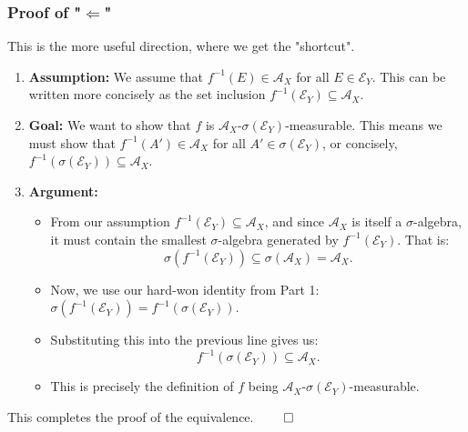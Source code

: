 \documentclass[11pt,a4paper]{article}
\theoremstyle{exercise_style}
\theoremstyle{definition}
\begin{document}
\subsubsection{Proof of "$\Leftarrow$"}
This is the more useful direction, where we get the "shortcut".
\begin{enumerate}
    \item \textbf{Assumption:} We assume that $f^{-1}(E) \in \mathcal{A}_X$ for all $E \in \mathcal{E}_Y$. This can be written more concisely as the set inclusion $f^{-1}(\mathcal{E}_Y) \subseteq \mathcal{A}_X$.
    \item \textbf{Goal:} We want to show that $f$ is $\mathcal{A}_X$-$\sigma(\mathcal{E}_Y)$-measurable. This means we must show that $f^{-1}(A') \in \mathcal{A}_X$ for all $A' \in \sigma(\mathcal{E}_Y)$, or concisely, $f^{-1}(\sigma(\mathcal{E}_Y)) \subseteq \mathcal{A}_X$.
    \item \textbf{Argument:}
        \begin{itemize}
            \item From our assumption $f^{-1}(\mathcal{E}_Y) \subseteq \mathcal{A}_X$, and since $\mathcal{A}_X$ is itself a $\sigma$-algebra, it must contain the smallest $\sigma$-algebra generated by $f^{-1}(\mathcal{E}_Y)$. That is:
            \[
                \sigma(f^{-1}(\mathcal{E}_Y)) \subseteq \sigma(\mathcal{A}_X) = \mathcal{A}_X.
            \]
            \item Now, we use our hard-won identity from Part 1: $\sigma(f^{-1}(\mathcal{E}_Y)) = f^{-1}(\sigma(\mathcal{E}_Y))$.
            \item Substituting this into the previous line gives us:
            \[
                f^{-1}(\sigma(\mathcal{E}_Y)) \subseteq \mathcal{A}_X.
            \]
            \item This is precisely the definition of $f$ being $\mathcal{A}_X$-$\sigma(\mathcal{E}_Y)$-measurable.
        \end{itemize}
\end{enumerate}
This completes the proof of the equivalence. \hfill $\qed$
\end{document}
